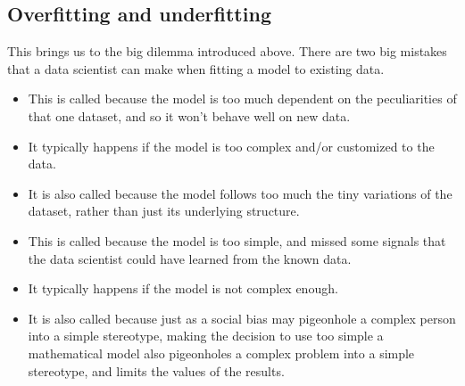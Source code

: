 \documentclass[letterpaper,10pt,english]{jupyterBook}
\begin{document}
\subsection{Overfitting and underfitting}
\label{\detokenize{chapter-17-machine-learning:overfitting-and-underfitting}}
\sphinxAtStartPar
This brings us to the big dilemma introduced above.  There are two big mistakes that a data scientist can make when fitting a model to existing data.

\sphinxAtStartPar
{}
\begin{itemize}
\item {} 
\sphinxAtStartPar
This is called  because the model is too much dependent on the peculiarities of that one dataset, and so it won’t behave well on new data.

\item {} 
\sphinxAtStartPar
It typically happens if the model is too complex and/or customized to the data.

\item {} 
\sphinxAtStartPar
It is also called  because the model follows too much the tiny variations of the dataset, rather than just its underlying structure.

\end{itemize}

\sphinxAtStartPar
{}
\begin{itemize}
\item {} 
\sphinxAtStartPar
This is called  because the model is too simple, and missed some signals that the data scientist could have learned from the known data.

\item {} 
\sphinxAtStartPar
It typically happens if the model is not complex enough.

\item {} 
\sphinxAtStartPar
It is also called  because just as a social bias may pigeonhole a complex person into a simple stereotype, making the decision to use too simple a mathematical model also pigeonholes a complex problem into a simple stereotype, and limits the values of the results.

\end{itemize}
\end{document}

